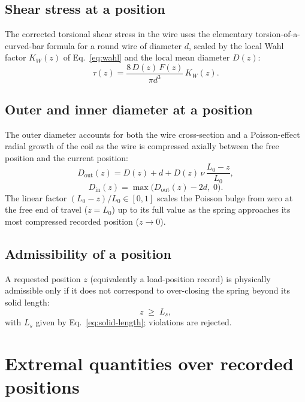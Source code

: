 \documentclass[11pt]{article}
\begin{document}
\subsection{Shear stress at a position}

The corrected torsional shear stress in the wire uses the elementary
torsion-of-a-curved-bar formula for a round wire of diameter $d$, scaled
by the local Wahl factor $K_W(z)$ of Eq.~\eqref{eq:wahl} and the local
mean diameter $D(z)$:
\begin{equation}
\tau(z) = \frac{8\,D(z)\,F(z)}{\pi d^{3}}\,K_W(z).
\label{eq:stress}
\end{equation}

\subsection{Outer and inner diameter at a position}

The outer diameter accounts for both the wire cross-section and a
Poisson-effect radial growth of the coil as the wire is compressed
axially between the free position and the current position:
\begin{equation}
D_{\mathrm{out}}(z) = D(z) + d + D(z)\,\nu\,\frac{L_0 - z}{L_0},
\label{eq:outer-diameter}
\end{equation}
\begin{equation}
D_{\mathrm{in}}(z) = \max\!\big(D_{\mathrm{out}}(z) - 2d,\; 0\big).
\label{eq:inner-diameter}
\end{equation}
The linear factor $(L_0-z)/L_0 \in [0,1]$ scales the Poisson bulge from
zero at the free end of travel ($z=L_0$) up to its full value as the
spring approaches its most compressed recorded position ($z\to 0$).

\subsection{Admissibility of a position}

A requested position $z$ (equivalently a load-position record) is
physically admissible only if it does not correspond to over-closing the
spring beyond its solid length:
\begin{equation}
z \;\ge\; L_s ,
\end{equation}
with $L_s$ given by Eq.~\eqref{eq:solid-length}; violations are rejected.

\section{Extremal quantities over recorded positions}
\end{document}
